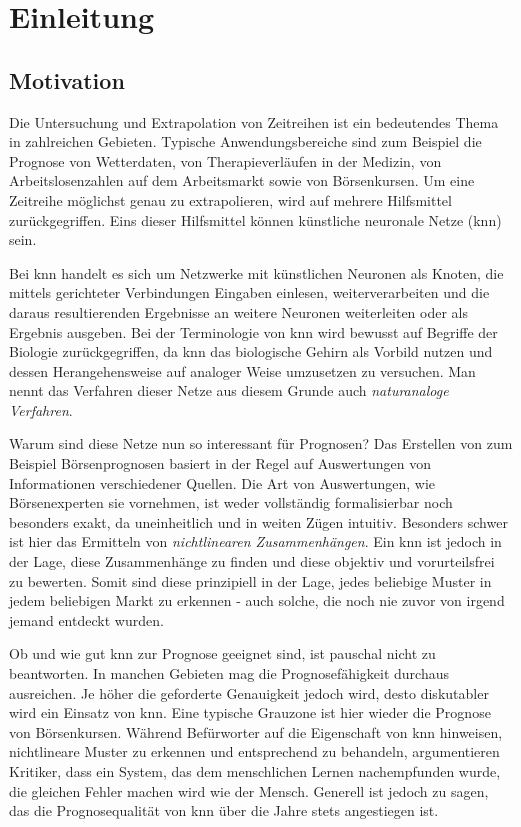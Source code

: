 \chapter{Einleitung}
\label{chapter:Einleitung}

\section{Motivation}
\label{section:Motivation}
Die Untersuchung und Extrapolation von Zeitreihen ist ein bedeutendes Thema in zahlreichen Gebieten. Typische Anwendungsbereiche sind zum Beispiel die Prognose von Wetterdaten, von Therapieverläufen in der  Medizin, von Arbeitslosenzahlen auf dem Arbeitsmarkt sowie von Börsenkursen. Um eine Zeitreihe möglichst genau zu extrapolieren, wird auf mehrere Hilfsmittel zurückgegriffen. Eins dieser Hilfsmittel können künstliche neuronale Netze (\acs{knn}) sein. 

Bei \acs{knn} handelt es sich um Netzwerke mit künstlichen Neuronen als Knoten, die mittels gerichteter Verbindungen Eingaben einlesen, weiterverarbeiten und die daraus resultierenden Ergebnisse an weitere Neuronen weiterleiten oder als Ergebnis ausgeben. Bei der Terminologie von \acs{knn} wird bewusst auf Begriffe der Biologie zurückgegriffen, da \acs{knn} das biologische Gehirn als Vorbild nutzen und dessen Herangehensweise auf analoger Weise umzusetzen zu versuchen. Man nennt das Verfahren dieser Netze aus diesem Grunde auch \textit{naturanaloge Verfahren}.

Warum sind diese Netze nun so interessant für Prognosen? Das Erstellen von zum Beispiel Börsenprognosen basiert in der Regel auf Auswertungen von Informationen verschiedener Quellen. Die Art von Auswertungen, wie Börsenexperten sie vornehmen, ist weder vollständig formalisierbar noch besonders exakt, da uneinheitlich und in weiten Zügen intuitiv. Besonders schwer ist hier das Ermitteln von \textit{nichtlinearen Zusammenhängen}. Ein \acs{knn} ist jedoch in der Lage, diese Zusammenhänge zu finden  und diese objektiv und vorurteilsfrei zu bewerten. Somit sind diese prinzipiell in der Lage, jedes beliebige Muster in jedem beliebigen Markt zu erkennen - auch solche, die noch nie zuvor von irgend jemand entdeckt wurden.

Ob und wie gut \acs{knn} zur Prognose geeignet sind, ist pauschal nicht zu beantworten. In manchen Gebieten mag die Prognosefähigkeit durchaus ausreichen. Je höher die geforderte Genauigkeit jedoch wird, desto diskutabler wird ein Einsatz von \acs{knn}. Eine typische Grauzone ist hier wieder die Prognose von Börsenkursen. Während Befürworter auf die Eigenschaft von \acs{knn} hinweisen, nichtlineare Muster zu erkennen und entsprechend zu behandeln, argumentieren Kritiker, dass ein System, das dem menschlichen Lernen nachempfunden wurde, die gleichen Fehler machen wird wie der Mensch. Generell ist jedoch zu sagen, das die Prognosequalität von \acs{knn} über die Jahre stets angestiegen ist.

